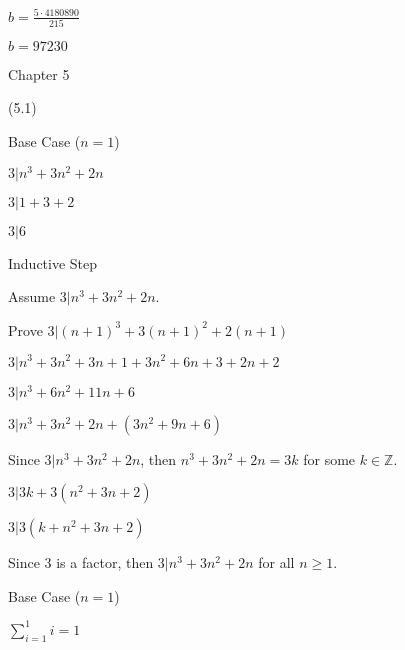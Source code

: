 \documentclass{exam}
\begin{document}
\begin{questions}
\begin{center}
\(b = \frac{5 \cdot 4180890}{215}\)

\(b = 97230\)

\end{center}





\vspace{10pt}
{\Large Chapter 5}
\vspace{2pt}

 (5.1)

\begin{center}

Base Case (\(n = 1\))

\(3|n^3 + 3n^2 + 2n\)

\(3|1 + 3 + 2\)

\(3|6\)
\vspace{5px}

Inductive Step

Assume \(3 | n^3 + 3n^2 + 2n\). 

Prove \(3 | (n+1)^3 + 3(n+1)^2 + 2(n+1)\)

\(3 | n^3 + 3n^2 + 3n + 1 + 3n^2 + 6n + 3 + 2n + 2\)

\(3 | n^3 + 6n^2 + 11n + 6\)

\(3 | n^3 + 3n^2 + 2n + (3n^2 + 9n + 6)\)

Since \(3 | n^3 + 3n^2 + 2n\), then \(n^3 + 3n^2 + 2n = 3k\) for some \(k \in \mathbb{Z}\).

\(3 | 3k + 3(n^2 + 3n + 2)\)

\(3 | 3(k+n^2+3n+2)\)

Since 3 is a factor, then \(3 | n^3 + 3n^2 + 2n\) for all \( n \geq 1 \).

\end{center}

\begin{subparts}

\begin{center}

Base Case (\(n = 1\))

\(\sum_{i=1}^{1} i = 1\)


\end{center}
\end{subparts}
\end{questions}
\end{document}
